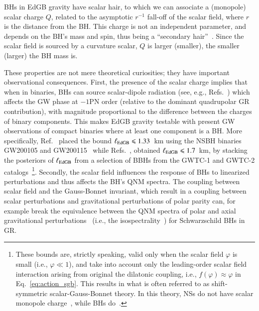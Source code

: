 \documentclass[twocolumn,
               prd,
               aps,
               superscriptaddress,
               tightenlines,
               nofootinbib,
               eqsecnum,
               amsfonts,
               amsmath,
               longbibliography]{revtex4-1}
\newcommand{\hs}[1]{{\textcolor{TealBlue}{{#1}}}}
\begin{document}
BHs in EdGB gravity have scalar hair, to which we can associate a (monopole) scalar charge $Q$,
related to the asymptotic $r^{-1}$ fall-off of the scalar field, where $r$ is the distance from the BH.
%
This charge is not an independent parameter, and depends on the BH's mass and spin,
thus being a ``secondary hair''~\cite{Coleman:1991ku,Kanti:1995vq,Herdeiro:2015waa}.
%
Since the scalar field is sourced by a curvature scalar, $Q$ is larger (smaller),
the smaller (larger) the BH mass is.

These properties are not mere theoretical curiosities; they have important observational consequences.
%
First, the presence of the scalar charge implies that when in binaries, BHs can source
scalar-dipole radiation (see, e.g., Refs.~\cite{Yagi:2011xp,Julie:2019sab,Shiralilou:2020gah,Shiralilou:2021mfl,Julie:2022huo})
which affects the GW phase at $-1$PN order (relative to the dominant quadrupolar GR
contribution), with magnitude proportional to the difference between the
charges of binary components. This makes EdGB gravity testable with present GW
observations of compact binaries where at least one component is a BH.
%
More specifically, Ref.~\cite{Lyu:2022gdr} placed the bound
%
$\ell_{\rm EdGB} \leqslant 1.33$~km
%
using the NSBH binaries GW200105 and
GW200115~\cite{LIGOScientific:2021qlt} while Refs.~\cite{Nair:2019iur,Perkins:2021mhb}, obtained
%
$\ell_{\rm EdGB} \leqslant 1.7$~km,
%
by stacking the posteriors of $\ell_{\rm EdGB}$ from a selection of BBHs
from the GWTC-1 and GWTC-2 catalogs~\cite{LIGOScientific:2018mvr,LIGOScientific:2020ibl}\footnote{\hs{These bounds
are, strictly speaking, valid only when the scalar field $\varphi$ is small (i.e., $\varphi \ll 1$), and
take into account only the leading-order scalar field interaction arising from original the dilatonic coupling, i.e.,
$f(\varphi) \approx \varphi$ in Eq.~\eqref{eq:action_sgb}.
This results in what is often referred to as shift-symmetric scalar-Gauss-Bonnet theory.
In this theory, NSs do not have scalar monopole charge~\cite{Yagi:2015oca}, while BHs do~\cite{Yunes:2011we,Sotiriou:2013qea,Sotiriou:2014pfa}.}}.
Secondly, the scalar field influences the response of BHs to linearized perturbations and thus
affects the BH's QNM spectra.
%
The coupling between scalar field and the Gauss-Bonnet invariant, which
result in a coupling between scalar perturbations and gravitational
perturbations of polar parity can, for example break the equivalence
between the QNM spectra of polar and axial gravitational perturbations~\cite{Glampedakis:2017rar,Lenzi:2021njy}
(i.e., the isospectrality~\cite{Chandrasekhar:1985kt}) for Schwarzschild BHs in GR.
\end{document}
